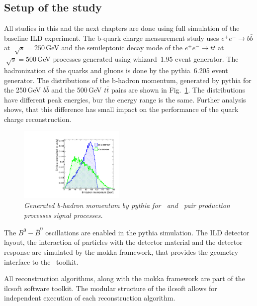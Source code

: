 \subsection{Setup of the study}

All studies in this and the next chapters are done using full simulation of the baseline ILD experiment. 
The b-quark charge measurement study uses $e^+e^- \to b\bar{b}$ at $\sqrt[]{s} = 250$\,GeV and the semileptonic decay mode of the $e^+e^- \to t\bar{t}$ at $\sqrt[]{s} = 500$\,GeV processes generated using {\sc whizard}~1.95 event generator. 
The hadronization of the quarks and gluons is done by the {\sc pythia}~6.205 event generator.
The distributions of the b-hadron momentum, generated by {\sc pythia} for the 250\,GeV $b\bar{b}$ and the 500\,GeV $t\bar{t}$ pairs are shown in Fig.~\ref{fig:GenHadronMomentum_3}. 
The distributions have different peak energies, bur the energy range is the same. Further analysis shows, that this difference has small impact on the performance of the quark charge reconstruction.
\begin{figure}[h]
	{\centering
		\includegraphics[width=0.45\textwidth]{ILD/plots/gen-hadron-momentum.pdf}
		\caption{\sl Generated b-hadron momentum by {\sc pythia} for \bbbar\ and \ttbar\ pair production processes signal processes.}
		\label{fig:GenHadronMomentum_3}
	}
\end{figure}

The $B^0-\bar{B}^0$ oscillations are enabled in the {\sc pythia} simulation. 
The ILD detector layout, the interaction of particles with the detector material and the detector response are simulated by the {\sc mokka} framework, that provides the geometry interface to the \geant\ toolkit. 

All reconstruction algorithms, along with the {\sc mokka} framework are part of the {\sc ilcsoft} software toolkit.
The modular structure of the {\sc ilcsoft} allows for independent execution of each reconstruction algorithm. 

